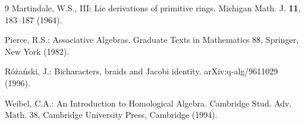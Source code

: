 \documentclass[]{interact}
\theoremstyle{plain}
\theoremstyle{definition}
\theoremstyle{remark}
\begin{document}
\begin{thebibliography}{9}
Martindale, W.S., III: Lie derivations of primitive rings. Michigan Math. J. \textbf{11}, 183--187 (1964).

Pierce, R.S.: Associative Algebras. Graduate Texts in Mathematics 88, Springer, New York (1982).

R\'o\.za\'nski, J.: Bicharacters, braids and Jacobi identity. arXiv:q-alg/9611029 (1996).

Weibel, C.A.: An Introduction to Homological Algebra. Cambridge Stud. Adv. Math. 38, Cambridge University Press, Cambridge (1994).

\end{thebibliography}
\end{document}
